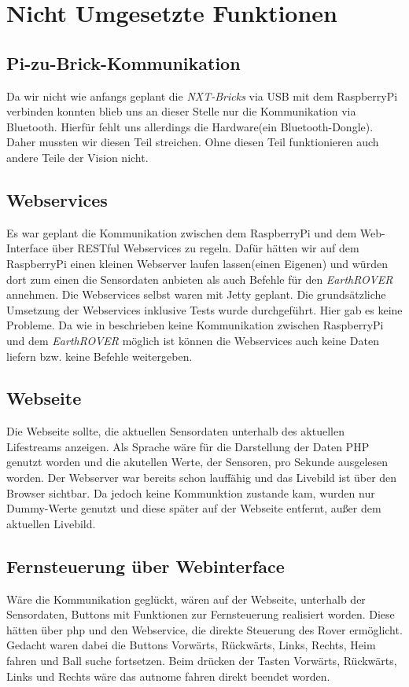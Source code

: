 \chapter{Nicht Umgesetzte Funktionen}
\section{Pi-zu-Brick-Kommunikation}
\label{lbl:ptbcomm}
Da wir nicht wie anfangs geplant die \textit{NXT-Bricks} via USB mit dem RaspberryPi verbinden konnten blieb uns an dieser Stelle nur die Kommunikation via Bluetooth. Hierfür fehlt uns allerdings die Hardware(ein Bluetooth-Dongle). Daher mussten wir diesen Teil streichen. Ohne diesen Teil funktionieren auch andere Teile der Vision nicht.

\section{Webservices}
Es war geplant die Kommunikation zwischen dem RaspberryPi und dem Web-Interface über RESTful Webservices zu regeln. Dafür hätten wir auf dem RaspberryPi einen kleinen Webserver laufen lassen(einen Eigenen) und würden dort zum einen die Sensordaten anbieten als auch Befehle für den \textit{EarthROVER} annehmen. Die Webservices selbst waren mit Jetty geplant. Die grundsätzliche Umsetzung der Webservices inklusive Tests wurde durchgeführt. Hier gab es keine Probleme. Da wie in  beschrieben keine Kommunikation zwischen RaspberryPi und dem \textit{EarthROVER} möglich ist können die Webservices auch keine Daten liefern bzw. keine Befehle weitergeben.

\section{Webseite}
Die Webseite sollte, die aktuellen Sensordaten unterhalb des aktuellen Lifestreams anzeigen. Als Sprache wäre für die Darstellung der Daten PHP genutzt worden und die akutellen Werte, der Sensoren, pro Sekunde ausgelesen worden. Der Webserver war bereits schon lauffähig und das Livebild ist über den Browser sichtbar. Da jedoch keine Kommunktion zustande kam, wurden nur Dummy-Werte genutzt und diese später auf der Webseite entfernt, außer dem aktuellen Livebild.

\section{Fernsteuerung über Webinterface}
Wäre die Kommunikation geglückt, wären auf der Webseite, unterhalb der Sensordaten, Buttons mit Funktionen zur Fernsteuerung realisiert worden. Diese hätten über php und den Webservice, die direkte Steuerung des Rover ermöglicht. Gedacht waren dabei die Buttons Vorwärts, Rückwärts, Links, Rechts, Heim fahren und Ball suche fortsetzen. Beim drücken der Tasten Vorwärts, Rückwärts, Links und Rechts wäre das autnome fahren direkt beendet worden.

